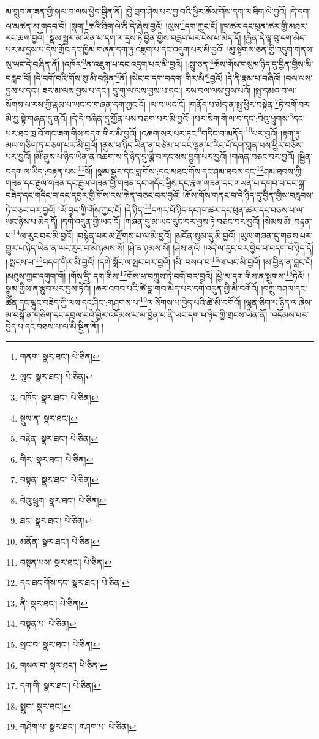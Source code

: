 མ་གྲུབ་ན་ཟན་གྱི་སྐལ་བ་ལས་ཕྱེད་སྦྱིན་ནོ། །བྱེ་བྲག་ཤེས་པར་བྱ་བའི་ཕྱིར་ཆོས་གོས་དག་ལ་ཐིག་ལེ་བྱའོ། །དེ་དག་ལ་མཚན་མ་གདབ་བོ། །སྣག་\footnote{གནག་  སྣར་ཐང་།  པེ་ཅིན། }ཚའི་ཐིག་ལེ་ནི་དེ་ཞེས་བྱའོ། །ལུས་\footnote{ལུང་  སྣར་ཐང་།  པེ་ཅིན། }དག་ཀྱང་ངོ། །ཁ་ཚར་དང་ཕུན་ཚར་གྱི་མཐར་རང་ཆག་བྱའོ། །སྣམ་སྦྱར་མ་ཡིན་པ་དག་ལ་དྲས་ཏེ་བྱིན་གྱིས་བརླབ་པར་ངེས་པ་མེད་དོ། །རྐྱེན་དེ་ལྟ་བུ་དག་མེད་པར་མ་དྲས་པ་དེས་གྲོང་དང་ཁྱིམ་གཞན་དག་ཏུ་འཇུག་པ་དང་འདུག་པར་མི་བྱའོ། །མུ་སྟེགས་ཅན་གྱི་འདུག་གནས་སུ་ཡང་དེ་བཞིན་ནོ། །འཁོར་\footnote{འཁོད་  སྣར་ཐང་།  པེ་ཅིན། }ན་འཇུག་པ་དང་འདུག་པར་མི་བྱའོ། །:སྤུ་ཅན་\footnote{སྡུས་ན་  སྣར་ཐང་། }ཆོས་གོས་གསུམ་ཉིད་དུ་བྱིན་གྱིས་མི་བརླབ་བོ། །དེ་བགོ་བའི་གོས་སུ་མི་བསྟེན་\footnote{བརྟེན་  སྣར་ཐང་།  པེ་ཅིན། }ནོ། །སེང་བ་དག་བདག་:གིར་མི་\footnote{གིར་  སྣར་ཐང་།  པེ་ཅིན། }བྱའོ། །དེ་ནི་རྣམ་པ་བཞིའོ། །བལ་ལས་བྱས་པ་དང་། ཟར་མ་ལས་བྱས་པ་དང་། དུ་གུ་ལ་ལས་བྱས་པ་དང་། རས་བལ་ལས་བྱས་པའོ། །སྤུ་དམའ་བ་ལ་སོགས་པ་རས་ཀྱི་རྣམ་པ་ཡང་བ་གཞན་དག་ཀྱང་ངོ། །ལ་བ་ཡང་ངོ། །གནོད་པ་མེད་ན་སྤུ་ཕྱིར་བསྟེན་\footnote{བསྟན་  སྣར་ཐང་།  པེ་ཅིན། }ཏེ་བགོ་བར་མི་བྱ་སྟེ་གཞན་དུ་ནའོ། །དེ་དེ་བཞིན་དུ་གྱོན་པས་བཅག་པར་མི་བྱའོ། །པར་སིག་གི་ལ་བ་དང་:བེའུ་ཕྲུགས་\footnote{བེའུ་ཕྲུག་  སྣར་ཐང་།  པེ་ཅིན། }དང་པར་ཐང་ཁྲ་བོ་གང་ཟག་གིས་བདག་གིར་མི་བྱའོ། །འཆག་སར་པར་ཏང་\footnote{ཐང་  སྣར་ཐང་།  པེ་ཅིན། }གདིང་བ་མནོད་\footnote{མནོན་  སྣར་ཐང་།  པེ་ཅིན། }པར་བྱའོ། །རྟག་ཏུ་མལ་གཅིག་ཏུ་བཅག་པར་མི་བྱའོ། །ནུས་པ་ཉིད་ཡིན་ན་བཙེམ་པ་དང་ལྷན་པ་རིང་པོ་དག་གླན་པས་ཕྱིར་བཅོས་པར་བྱའོ། །མི་ནུས་པ་ཉིད་ཡིན་ན་འཆག་ས་དེ་ཉིད་དུ་ལྕི་བ་དང་སས་བྱུག་པར་བྱའོ། །གཞན་བཅང་བར་བྱའོ། །སྦྱིན་བདག་ལ་ཡིད་:བརྟན་པས་\footnote{བསྟན་པས་  སྣར་ཐང་།  པེ་ཅིན། }སོ། །སྣམ་སྦྱར་དང་བླ་གོས་:དང་མཐང་གོས་དང་ཤམ་ཐབས་དང་\footnote{དང་ཐང་གོས་དང་  སྣར་ཐང་།  པེ་ཅིན། }ཤམ་ཐབས་ཀྱི་གཟན་དང་རྔུལ་གཟན་དང་རྔུལ་གཟན་གྱི་གཟན་དང་གདོང་ཕྱིས་དང་རྣག་གཟན་དང་གཡན་པ་དགབ་པ་དང་སྐྲ་བཟེད་དང་གདིང་བ་དང་དབྱར་གྱི་གོས་རས་ཆེན་བཅང་བར་བྱའོ། །ཆོས་གོས་གནང་བ་དེ་ཉིད་དུ་བྱིན་གྱིས་བརླབས་ཏེ་བཅང་བར་བྱའོ། །ཡོ་བྱད་ཀྱི་གོས་ཀྱང་ངོ། །དེ་ཉིད་\footnote{ནི་  སྣར་ཐང་།  པེ་ཅིན། }དཀར་པོ་ཉིད་དང་ཁ་ཚར་དང་ཕུན་ཚར་དང་བཅས་པ་ལ་ཡང་ཉེས་པ་མེད་དོ། །དགེ་འདུན་གྱི་ཡང་ངོ། །གཞན་དུ་མ་ཡང་རུང་བར་བྱས་ཏེ་བཅང་བར་བྱའོ། །སེམས་མི་:བརྟན་པ་\footnote{བསྟན་པ་  པེ་ཅིན། }ལ་རུང་བར་མི་བྱའོ། །བསྙེན་པར་མ་རྫོགས་པ་ལ་མི་བྱའོ། །མངོན་སུམ་དུ་མི་བྱའོ། །ཡུལ་གཞན་དུ་གནས་པར་གྱུར་པ་ཉིད་ཡིན་ན་ཡང་རུང་བ་མི་ཉམས་སོ། །ཤི་ན་ཉམས་སོ། །ཤེས་ནའོ། །འདི་ལ་རུང་བར་བྱེད་པ་བདག་པོ་ཉིད་དོ། །:སྤངས་པ་\footnote{སྤང་བ་  སྣར་ཐང་།  པེ་ཅིན། }བདག་གིར་མི་བྱའོ། །དགེ་སློང་ལ་སྤང་བར་བྱའོ། །མི་:བསལ་བ་\footnote{གསལ་བ་  སྣར་ཐང་།  པེ་ཅིན། }ལ་ཡང་མི་བྱའོ། །མ་བྱིན་ན་བླང་ངོ། །མཐུས་ཀྱང་དགུག་གོ། །གོས་དྲི་:དག་གིས་\footnote{དག་གི་  སྣར་ཐང་།  པེ་ཅིན། }གོས་པ་བཀྲུས་ཏེ་བགོ་བར་བྱའོ། །ཕྱེ་མ་དག་གིས་ན་སྤྲུགས་\footnote{སྤྲུག་  སྣར་ཐང་། }ཏེའོ། །སྣུམ་གྱིས་ན་རྩུབ་པར་བྱས་ཏེའོ། །ཆར་འབབ་པའི་ཚེ་བླ་གབ་མེད་པར་དགེ་འདུན་གྱི་མི་བགོའོ། །བཀྲུ་བཤལ་དང་ཚོན་དང་ལྷུང་བཟེད་ཀྱི་ལས་དང་ཤིང་:གཤགས་པ་\footnote{གཤེག་པ་  སྣར་ཐང་། གཤག་པ་  པེ་ཅིན། }ལ་སོགས་པ་བྱེད་པའི་ཚེ་མི་བགོའོ། །ལྷན་ཅིག་པ་ཉིད་ལ་ཞེས་མ་བསྒོ་ན་གཅིག་དང་དབྲལ་བའི་ཕྱིར་འདོམས་པ་ལ་བྱིན་པ་ནི་ཡང་དག་པ་ཉིད་ཀྱི་གྲངས་ཡིན་ནོ། །འདོམས་པར་བྱེད་པ་དང་བཅས་པ་ལ་མི་སྦྱིན་ནོ། །

